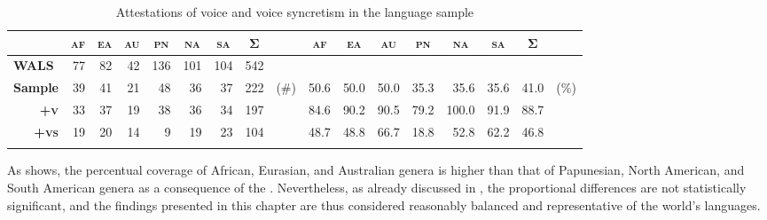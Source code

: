 \begin{table}
	\setlength{\tabcolsep}{2.2pt}
	\begin{tabularx}{\textwidth}{lrrrrrrrlrrrrrrrl}
		\lsptoprule
		& \multicolumn{1}{c}{\textbf{\textsc{af}}} & \multicolumn{1}{c}{\textbf{\textsc{ea}}} & \multicolumn{1}{c}{\textbf{\textsc{au}}} & \multicolumn{1}{c}{\textbf{\textsc{pn}}} & \multicolumn{1}{c}{\textbf{\textsc{na}}} & \multicolumn{1}{c}{\textbf{\textsc{sa}}} & \multicolumn{1}{c}{\textbf{Σ}} & & \multicolumn{1}{c}{\textbf{\textsc{af}}} & \multicolumn{1}{c}{\textbf{\textsc{ea}}} & \multicolumn{1}{c}{\textbf{\textsc{au}}} & \multicolumn{1}{c}{\textbf{\textsc{pn}}} & \multicolumn{1}{c}{\textbf{\textsc{na}}} & \multicolumn{1}{c}{\textbf{\textsc{sa}}} & \multicolumn{1}{c}{\textbf{Σ}} & \\
		\midrule
		\textbf{WALS} & 77 & 82 & 42 & 136 & 101 & 104 & 542 & & & & & & & & & \\
		\midrule
		\textbf{Sample} & 39 & 41 & 21 & 48 & 36 & 37 & 222 & (\#) & 50.6 & 50.0 & 50.0 & 35.3 & 35.6 & 35.6 & 41.0 & (\%) \\
		\multicolumn{1}{r}{\textbf{+\textsc{v}}} & 33 & 37 & 19 & 38 & 36 & 34 & 197 & & 84.6 & 90.2 & 90.5 & 79.2 & 100.0 & 91.9 & 88.7 & \\
		\multicolumn{1}{r}{\textbf{+\textsc{vs}}} & 19 & 20 & 14 & 9 & 19 & 23 & 104 & & 48.7 & 48.8 & 66.7 & 18.8 & 52.8 & 62.2 & 46.8 &\\
		\lspbottomrule
	\end{tabularx}
	\caption{Attestations of voice and voice syncretism in the language sample}
	\label{tab:ch6:voice-syncretism}
\end{table} 

As  shows, the percentual coverage of African, Eurasian, and Australian genera is higher than that of Papunesian, North American, and South American genera as a consequence of the . Nevertheless, as already discussed in , the proportional differences are not statistically significant, and the findings presented in this chapter are thus considered reasonably balanced and representative of the world’s languages. 

